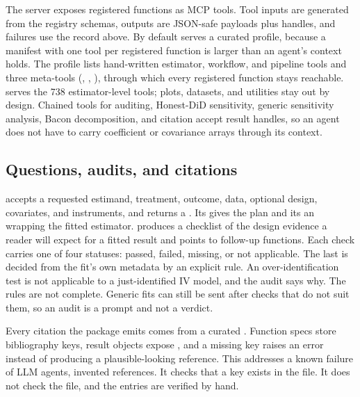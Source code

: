 The  server exposes registered functions as MCP tools.
Tool inputs are generated from the registry schemas, outputs are JSON-safe
payloads plus  handles, and failures use the record
above. By default  serves a curated profile, because a
manifest with one tool per registered function is larger than an agent's
context holds. The profile lists hand-written estimator, workflow, and
pipeline tools and three meta-tools (,
, ), through which every
registered function stays reachable.  serves the
738 estimator-level tools; plots, datasets, and utilities stay out by
design. Chained tools for auditing, Honest-DiD sensitivity, generic
sensitivity analysis, Bacon decomposition, and citation accept result
handles, so an agent does not have to carry coefficient or covariance
arrays through its context.

\subsection{Questions, audits, and citations}\label{sec:causal-question}\label{sec:cite}\label{sec:agent-compare}

 accepts a requested estimand, treatment,
outcome, data, optional design, covariates, and instruments, and returns a
. Its  gives the plan and its
 an  wrapping the fitted
estimator.  produces a checklist of the design
evidence a reader will expect for a fitted result and points to follow-up
functions. Each check carries one of four statuses: passed, failed,
missing, or not applicable. The last is decided from the fit's own
metadata by an explicit rule. An over-identification test is not applicable
to a just-identified IV model, and the audit says why. The rules are not
complete. Generic fits can still be sent after checks that do not suit
them, so an audit is a prompt and not a verdict.

Every citation the package emits comes from a curated .
Function specs store bibliography keys, result objects expose
, and a missing key raises an error instead of
producing a plausible-looking reference. This addresses a known failure of
LLM agents, invented references. It checks that a key exists in the file.
It does not check the file, and the entries are verified by hand.
